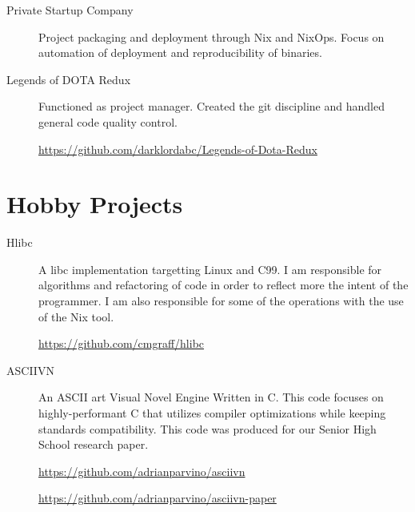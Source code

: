 \documentclass{article}
\begin{document}
\begin{description}
%
\item [Private Startup Company] Project packaging and deployment through
  Nix and NixOps. Focus on automation of deployment and reproducibility of binaries.

\item [Legends of DOTA Redux] Functioned as project manager. Created the git
  discipline and handled general code quality control.

  \href{https://github.com/darklordabc/Legends-of-Dota-Redux}{https://github.com/darklordabc/Legends-of-Dota-Redux}
\end{description}

\hrulefill
\section*{Hobby Projects}

\begin {description}
\item [Hlibc] A libc implementation targetting Linux and C99. I am responsible
  for algorithms and refactoring of code in order to reflect more
  the intent of the programmer. I am also responsible for some of the operations
  with the use of the Nix tool.

  \href{https://github.com/cmgraff/hlibc}{https://github.com/cmgraff/hlibc}

\item [ASCIIVN] An ASCII art Visual Novel Engine Written in C.
  This code focuses on highly-performant C that utilizes compiler optimizations
  while keeping standards compatibility.
  This code was produced for our Senior High School research paper.

  \href{https://github.com/adrianparvino/asciivn}{https://github.com/adrianparvino/asciivn}

  \href{https://github.com/adrianparvino/asciivn-paper}{https://github.com/adrianparvino/asciivn-paper}

%

%
\end{description}
\end{document}
